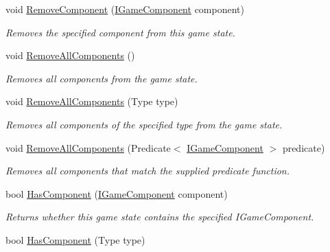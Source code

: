 \begin{DoxyCompactItemize}
void \hyperlink{interface_tri_devs_1_1_tri_engine_1_1_state_management_1_1_i_game_state_a4f5194328c029ac8704dc24c52f578d6}{Remove\-Component} (\hyperlink{interface_tri_devs_1_1_tri_engine_1_1_interfaces_1_1_i_game_component}{I\-Game\-Component} component)
\begin{DoxyCompactList}\small\item\em Removes the specified component from this game state. \end{DoxyCompactList}\item 
void \hyperlink{interface_tri_devs_1_1_tri_engine_1_1_state_management_1_1_i_game_state_a790c53d9df250aeba796fb6a55c312e2}{Remove\-All\-Components} ()
\begin{DoxyCompactList}\small\item\em Removes all components from the game state. \end{DoxyCompactList}\item 
void \hyperlink{interface_tri_devs_1_1_tri_engine_1_1_state_management_1_1_i_game_state_a8edcb9c09c4c48a6e0e818b8fa88c454}{Remove\-All\-Components} (Type type)
\begin{DoxyCompactList}\small\item\em Removes all components of the specified type from the game state. \end{DoxyCompactList}\item 
void \hyperlink{interface_tri_devs_1_1_tri_engine_1_1_state_management_1_1_i_game_state_a6ceadf15884a499e50f4c4f400659ff5}{Remove\-All\-Components} (Predicate$<$ \hyperlink{interface_tri_devs_1_1_tri_engine_1_1_interfaces_1_1_i_game_component}{I\-Game\-Component} $>$ predicate)
\begin{DoxyCompactList}\small\item\em Removes all components that match the supplied predicate function. \end{DoxyCompactList}\item 
bool \hyperlink{interface_tri_devs_1_1_tri_engine_1_1_state_management_1_1_i_game_state_abd732df555e75f909332a4162f1155dd}{Has\-Component} (\hyperlink{interface_tri_devs_1_1_tri_engine_1_1_interfaces_1_1_i_game_component}{I\-Game\-Component} component)
\begin{DoxyCompactList}\small\item\em Returns whether this game state contains the specified I\-Game\-Component. \end{DoxyCompactList}\item 
bool \hyperlink{interface_tri_devs_1_1_tri_engine_1_1_state_management_1_1_i_game_state_aaafcf6cd54b753c63e366dbe2f6c3a69}{Has\-Component} (Type type)

\end{DoxyCompactItemize}
